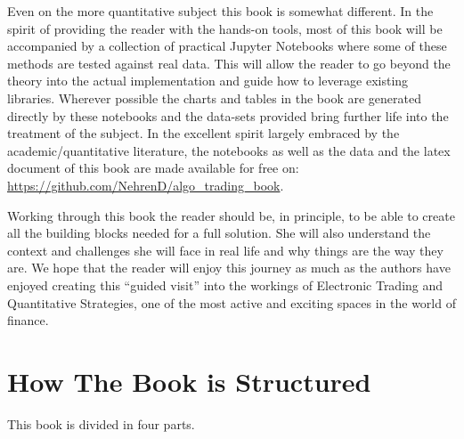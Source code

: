 Even on the more quantitative subject this book is somewhat different. In the spirit of providing the reader with the hands-on tools, most of this book will be accompanied by a collection of practical Jupyter Notebooks where some of these methods are tested against real data. This will allow the reader to go beyond the theory into the actual implementation and guide how to leverage existing libraries. Wherever possible the charts and tables in the book are generated directly by these notebooks and the data-sets provided bring further life into the treatment of the subject. In the excellent spirit largely embraced by the academic/quantitative literature, the notebooks as well as the data and the latex document of this book are made  available for free on: \url{https://github.com/NehrenD/algo_trading_book}.


Working through this book the reader should be, in principle, to be able to create all the building blocks needed for a full solution. She will also understand the context and challenges she will face in real life and why things are the way they are. We hope that the reader will enjoy this journey as much as the authors have enjoyed creating this ``guided visit'' into the workings of Electronic Trading and Quantitative Strategies, one of the most active and exciting spaces in the world of finance.



\section{How The Book is Structured}

This book is divided in four parts. 


